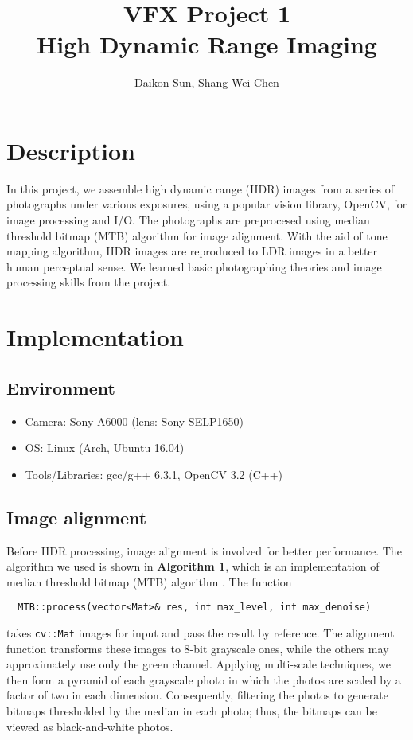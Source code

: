 \documentclass[11pt]{article}
\title{\bf{VFX Project 1\\\large{High Dynamic Range Imaging}}}
\author{Daikon Sun, Shang-Wei Chen}
\date{}
\begin{document}
\maketitle
\section{Description}
In this project, we assemble high dynamic range (HDR) images from a series of photographs under various exposures, using a popular vision library, OpenCV, for image processing and I/O. The photographs are preprocesed using median threshold bitmap (MTB) algorithm for image alignment. With the aid of tone mapping algorithm, HDR images are reproduced to LDR images in a better human perceptual sense. We learned basic photographing theories and image processing skills from the project. 

\section{Implementation}
\subsection{Environment}
\begin{itemize}
	\itemsep=0pt
	\item Camera: Sony A6000 (lens: Sony SELP1650)
	\item OS: Linux (Arch, Ubuntu 16.04)
	\item Tools/Libraries: gcc/g++ 6.3.1, OpenCV 3.2 (C++)
\end{itemize}

\subsection{Image alignment}
Before HDR processing, image alignment is involved for better performance.
The algorithm we used is shown in \textbf{Algorithm 1}, 
which is an implementation of median threshold bitmap (MTB) algorithm \cite{ref:Ward}.
The function 
\begin{lstlisting}
  MTB::process(vector<Mat>& res, int max_level, int max_denoise)
\end{lstlisting}
takes \texttt{cv::Mat} images for input and pass the result by reference.
The alignment function transforms these images to 8-bit grayscale ones,
while the others may approximately use only the green channel.
Applying multi-scale techniques, we then form a pyramid of each grayscale photo 
in which the photos are scaled by a factor of two in each dimension.
Consequently, filtering the photos to generate bitmaps thresholded by the median
in each photo; thus, the bitmaps can be viewed as black-and-white photos.
\end{document}
